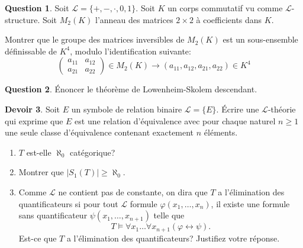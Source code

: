 \documentclass[a4paper, 12pt]{article}
\theoremstyle{definition} \newtheorem{quest}{Question}
\theoremstyle{definition} \newtheorem{dev}[quest]{Devoir}
\begin{document}
\begin{quest}
  Soit $\mathscr L=\{+, -, \cdot, 0, 1\}$.
  Soit $K$ un corps commutatif vu comme $\mathscr L$-structure.
  Soit $M_2(K)$ l'anneau des matrices $2\times 2$ à coefficients
  dans $K$.

  Montrer que le groupe des matrices inversibles de $M_2(K)$
  est un sous-ensemble définissable de $K^4$, modulo
  l'identification suivante:
  \begin{equation*}
    \left( \begin{matrix}
        a_{1 1} & a_{1 2} \\
        a_{2 1} & a_{2 2}
      \end{matrix} \right)\in M_2(K)
    \rightarrow (a_{1 1}, a_{1 2}, a_{2 1}, a_{2 2}) \in K^4
  \end{equation*}
\end{quest}

\begin{quest}
  \'{E}noncer le théorème de Lowenheim-Skolem descendant.
\end{quest}

\begin{dev}
  Soit $E$ un symbole de relation binaire $\mathscr L= \{E\}$.
  \'{E}crire une $\mathscr L$-théorie qui exprime que $E$ est
  une relation d'équivalence avec pour chaque naturel $n\geq 1$
  une seule classe d'équivalence contenant exactement $n$ éléments.
  \begin{enumerate}
  \item $T$ est-elle $\aleph_0$ catégorique?
  \item Montrer que $|S_1(T)|\geq \aleph_0$.
  \item Comme $\mathscr L$ ne contient pas de constante,
    on dira que $T$ a l'élimination des quantificateurs
    si pour tout $\mathscr L$ formule $\varphi(x_1, \ldots, x_n)$,
    il existe une formule sans quantificateur
    $\psi(x_1, \ldots, x_{n+1})$ telle que
    $$T\models \forall x_1 \ldots \forall x_{n+1}
    (\varphi\leftrightarrow \psi).$$
    Est-ce que $T$ a l'élimination des quantificateurs? Justifiez
    votre réponse.
  \end{enumerate}
\end{dev}
\end{document}
